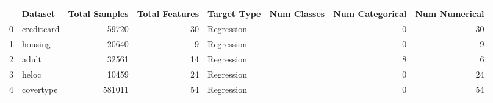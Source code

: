 \begin{tabular}{rlrrllrr}
\toprule
    & Dataset    &   Total Samples &   Total Features & Target Type   & Num Classes   &   Num Categorical &   Num Numerical \\
\midrule
  0 & creditcard &           59720 &               30 & Regression    &               &                 0 &              30 \\
  1 & housing    &           20640 &                9 & Regression    &               &                 0 &               9 \\
  2 & adult      &           32561 &               14 & Regression    &               &                 8 &               6 \\
  3 & heloc      &           10459 &               24 & Regression    &               &                 0 &              24 \\
  4 & covertype  &          581011 &               54 & Regression    &               &                 0 &              54 \\
\bottomrule
\end{tabular}